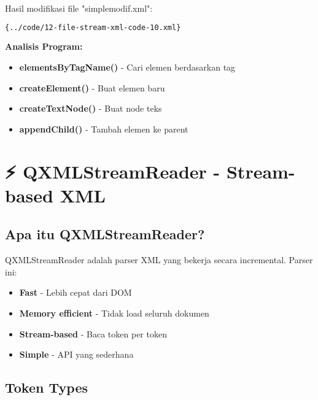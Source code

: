Hasil modifikasi file "simplemodif.xml":

\begin{lstlisting}[language=xml]{../code/12-file-stream-xml-code-10.xml}
\end{lstlisting}

\textbf{Analisis Program:}
\begin{itemize}
\item \textbf{elementsByTagName()} - Cari elemen berdasarkan tag
\item \textbf{createElement()} - Buat elemen baru
\item \textbf{createTextNode()} - Buat node teks
\item \textbf{appendChild()} - Tambah elemen ke parent
\end{itemize}

\section{⚡ QXMLStreamReader - Stream-based XML}

\subsection{Apa itu QXMLStreamReader?}

QXMLStreamReader adalah parser XML yang bekerja secara incremental. Parser ini:

\begin{itemize}
\item \textbf{Fast} - Lebih cepat dari DOM
\item \textbf{Memory efficient} - Tidak load seluruh dokumen
\item \textbf{Stream-based} - Baca token per token
\item \textbf{Simple} - API yang sederhana
\end{itemize}

\subsection{Token Types}


